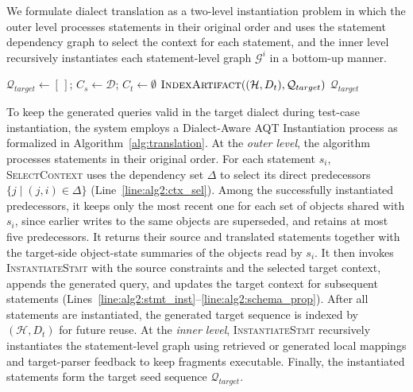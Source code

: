 \documentclass[conference]{IEEEtran}
\begin{document}
We formulate dialect translation as a two-level instantiation problem in which the outer level processes statements in their original order and uses the statement dependency graph to select the context for each statement, and the inner level recursively instantiates each statement-level graph $\mathcal{G}^i$ in a bottom-up manner.
\begin{algorithm}[htbp]
\small
\caption{AQT Instantiation}
\label{alg:translation}
$\mathcal{Q}_{target} \leftarrow [\,]$; $C_s \leftarrow \mathcal{D}$; $C_t \leftarrow \emptyset$\;
$\textsc{IndexArtifact}((\mathcal{H}, D_t), \mathcal{Q}_{target})$ 
\Return $\mathcal{Q}_{target}$\;
\end{algorithm}
To keep the generated queries valid in the target dialect during test-case instantiation, the system employs a Dialect-Aware AQT Instantiation process as formalized in Algorithm~\ref{alg:translation}.
At the \emph{outer level}, the algorithm processes statements in their original order.
For each statement $s_i$, \textsc{SelectContext} uses the dependency set $\Delta$ to select its direct predecessors $\{j \mid (j,i)\in\Delta\}$ (Line~\ref{line:alg2:ctx_sel}). Among the successfully instantiated predecessors, it keeps only the most recent one for each set of objects shared with $s_i$, since earlier writes to the same objects are superseded, and retains at most five predecessors. It returns their source and translated statements together with the target-side object-state summaries of the objects read by $s_i$.
It then invokes \textsc{InstantiateStmt} with the source constraints and the selected target context, appends the generated query, and updates the target context for subsequent statements (Lines~\ref{line:alg2:stmt_inst}--\ref{line:alg2:schema_prop}).
After all statements are instantiated, the generated target sequence is indexed by $(\mathcal{H},D_t)$ for future reuse.
At the \emph{inner level}, \textsc{InstantiateStmt} recursively instantiates the statement-level graph using retrieved or generated local mappings and target-parser feedback to keep fragments executable.
Finally, the instantiated statements form the target seed sequence $\mathcal{Q}_{target}$.
\end{document}
